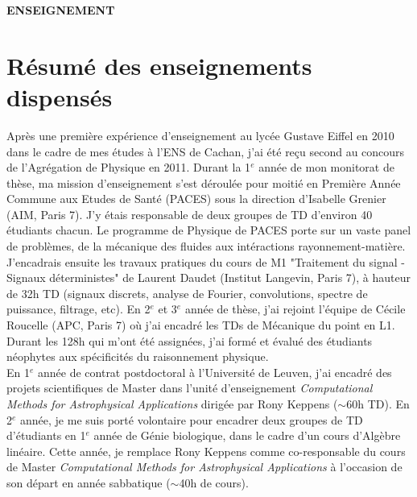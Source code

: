 \documentclass[12pt,onecolumn]{article}
\title{	
\vspace*{-2.5cm}
}
\author{\tiny} %
\date{\tiny }%
\begin{document}


\renewcommand{\headrulewidth}{1pt}
\pagestyle{fancy}
\fancyhf{}
\rfoot{\thepage / \pageref{LastPage}}
\begin{center}
\Large \textbf{ENSEIGNEMENT}
\end{center}
\normalfont
\vspace*{-0.4cm}

\section*{Résumé des enseignements dispensés}

\indent \indent Apr\`es une premi\`ere exp\'erience d'enseignement au lycée Gustave Eiffel en 2010 dans le cadre de mes \'etudes \`a l'ENS de Cachan, j'ai été reçu second au concours de l'Agr\'egation de Physique en 2011. Durant la 1$^{e}$ ann\'ee de mon monitorat de th\`ese, ma mission d'enseignement s'est d\'eroul\'ee pour moiti\'e en Premi\`ere Ann\'ee Commune aux Etudes de Sant\'e (PACES) sous la direction d'Isabelle Grenier (AIM, Paris 7). J'y \'etais responsable de deux groupes de TD d'environ 40 \'etudiants chacun. Le programme de Physique de PACES porte sur un vaste panel de probl\`emes, de la m\'ecanique des fluides aux int\'eractions rayonnement-mati\`ere. J'encadrais ensuite les travaux pratiques du cours de M1 "Traitement du signal - Signaux d\'eterministes" de Laurent Daudet (Institut Langevin, Paris 7), \`a hauteur de 32h TD (signaux discrets, analyse de Fourier, convolutions, spectre de puissance, filtrage, etc). En 2$^{e}$ et 3$^{e}$ année de thèse, j'ai rejoint l'\'equipe de C\'ecile Roucelle (APC, Paris 7) o\`u j'ai encadr\'e les TDs de M\'ecanique du point en L1. Durant les 128h qui m'ont \'et\'e assign\'ees, j'ai form\'{e} et évalué des \'etudiants n\'eophytes aux sp\'ecificit\'es du raisonnement physique.\\

\indent En 1$^{e}$ année de contrat postdoctoral à l'Université de Leuven, j'ai encadr\'e des projets scientifiques de Master dans l'unit\'e d'enseignement \textit{Computational Methods for Astrophysical Applications} dirig\'ee par Rony Keppens ($\sim$60h TD). En 2$^{e}$ année, je me suis porté volontaire pour encadrer deux groupes de TD d'étudiants en 1$^{e}$ année de Génie biologique, dans le cadre d'un cours d'Algèbre linéaire. Cette année, je remplace Rony Keppens comme co-responsable du cours de Master \textit{Computational Methods for Astrophysical Applications} à l'occasion de son départ en année sabbatique ($\sim$40h de cours).\\
\end{document}
